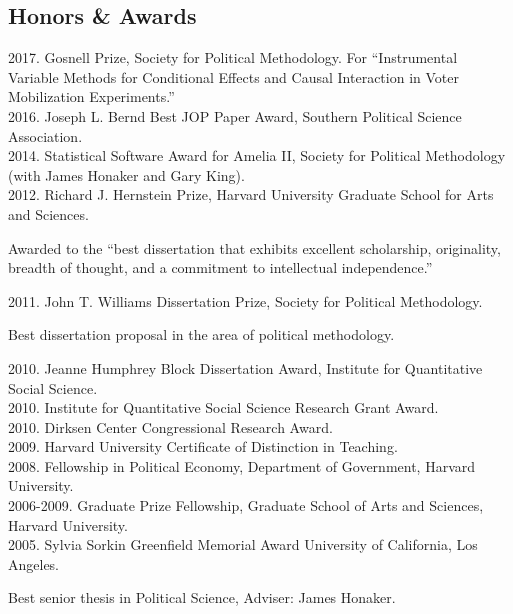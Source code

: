 \documentclass[margin,line,12pt]{res}
\newenvironment{list1}{
  \begin{list}{\ding{113}}{%
      \setlength{\itemsep}{0in}
      \setlength{\parsep}{0in} \setlength{\parskip}{0in}
      \setlength{\topsep}{0in} \setlength{\partopsep}{0in} 
      \setlength{\leftmargin}{0.83 cm}}}{\end{list}}
\begin{document}
\begin{resume}
\section{\sc Honors \&\hspace{1em} Awards}
2017. Gosnell Prize, Society for Political Methodology. For ``Instrumental Variable Methods for Conditional Effects and Causal Interaction in Voter Mobilization Experiments.'' \\
2016. Joseph L. Bernd Best JOP Paper Award, Southern Political Science Association.  \\
2014. Statistical Software Award for Amelia II, Society for Political Methodology (with James Honaker and Gary King).\\
2012. Richard J. Hernstein Prize, Harvard University Graduate School
for Arts and Sciences.
\begin{list1}
\item[] Awarded to the ``best dissertation that exhibits excellent scholarship, originality, breadth of 
thought, and a commitment to intellectual independence.''
\end{list1}
\vspace{-1em}
2011. John T. Williams Dissertation Prize, Society for Political Methodology.
\begin{list1} 
\item[] Best dissertation proposal in the area of political methodology.
\end{list1}
\vspace{-1em}
2010. Jeanne Humphrey Block Dissertation Award, Institute for Quantitative Social Science. \\
2010. Institute for Quantitative Social Science Research Grant Award.\\
2010. Dirksen Center Congressional Research Award.\\
2009. Harvard University Certificate of Distinction in Teaching. \\
2008. Fellowship in Political Economy, Department of Government, Harvard
University.\\
2006-2009. Graduate Prize Fellowship, Graduate School of Arts and Sciences, Harvard
University.\\
2005. Sylvia Sorkin Greenfield Memorial Award University of California, Los Angeles.
\begin{list1} 
\item[] Best senior thesis in Political Science, Adviser: James Honaker.
\end{list1}




\end{resume}
\end{document}
